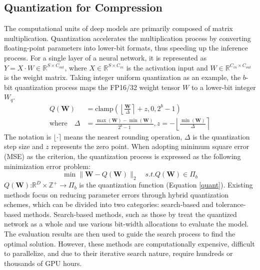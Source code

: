 \subsection{Quantization for Compression}
The computational units of deep models are primarily composed of matrix multiplication. Quantization accelerates the multiplication process by converting floating-point parameters into lower-bit formats, thus speeding up the inference process. For a single layer of a neural network, it is represented as $Y=X\cdot W \in \mathbb{R}^{S\times C_{out}}$, where $X\in \mathbb{R}^{S\times C_{in}}$ is the activation input and $W \in \mathbb{R}^{C_{in}\times C_{out}}$ is the weight matrix. Taking integer uniform quantization as an example, the $b$-bit quantization process maps the FP16/32 weight tensor $W$ to a lower-bit integer $W_q$.
\begin{equation}
\begin{aligned}
Q(\textbf{W})&=\mathrm{clamp}\left(\left\lfloor\frac{\mathbf{W}}{\Delta}\right\rceil+z,0,2^b-1\right) \\
\mathrm{where}\quad\Delta&=\frac{\max(\mathbf{W})-\min(\mathbf{W})}{2^b-1},z=-\left\lfloor\frac{\min(\mathbf{W})}{\Delta}\right\rceil
\end{aligned}
\label{quant}
\end{equation}
The notation is $\lfloor\cdot\rceil$ means the nearest rounding operation, $\Delta$ is the quantization step size and $z$ represents the zero point.
When adopting minimum square error (MSE) as the criterion, the quantization process is expressed as the following minimization error problem:
\begin{equation}
\operatorname*{min}\|\textbf{W}-Q(\textbf{W})\|_{2}\quad s.t.Q(\textbf{W})\in\Pi_{b}
\end{equation}
$Q(\textbf{W})$:$\mathbb{R}^D\times\mathbb{Z}^+\to\Pi_b$ is the quantization function (Equation \ref{quant}).
Existing methods focus on reducing parameter errors through hybrid quantization schemes, which can be divided into two categories: search-based and tolerance-based methods.
Search-based methods, such as those by \cite{wang2019haq, lou2019autoq, wu2018mixed} treat the quantized network as a whole and use various bit-width allocations to evaluate the model. The evaluation results are then used to guide the search process to find the optimal solution. However, these methods are computationally expensive, difficult to parallelize, and due to their iterative search nature, require hundreds or thousands of GPU hours.

